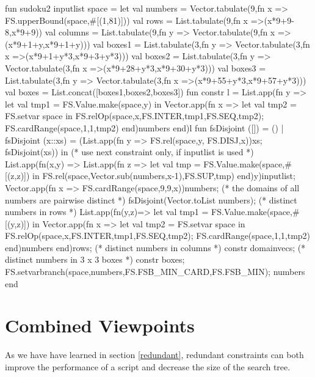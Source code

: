 \documentclass[a4paper,halfparskip]{scrartcl}
\begin{document}
\begin{myverbatim}
fun sudoku2 inputlist space = 
  let
     val numbers = Vector.tabulate(9,fn x => 
                        FS.upperBound(space,#[(1,81)]))
     val rows = List.tabulate(9,fn x =>(x*9+9-8,x*9+9)) 
     val columns = List.tabulate(9,fn y => 
                       Vector.tabulate(9,fn x =>(x*9+1+y,x*9+1+y)))
     val boxes1 = List.tabulate(3,fn y => 
                   Vector.tabulate(3,fn x =>(x*9+1+y*3,x*9+3+y*3)))
     val boxes2 = List.tabulate(3,fn y => 
                   Vector.tabulate(3,fn x =>(x*9+28+y*3,x*9+30+y*3)))
     val boxes3 = List.tabulate(3,fn y => 
                   Vector.tabulate(3,fn x =>(x*9+55+y*3,x*9+57+y*3)))
     val boxes = List.concat([boxes1,boxes2,boxes3])
     fun constr l = 
       List.app(fn y => 
                 let
                    val tmp1 = FS.Value.make(space,y)
                 in
                    Vector.app(fn x => 
                     let 
                        val tmp2 = FS.setvar space 
                     in
                        FS.relOp(space,x,FS.INTER,tmp1,FS.SEQ,tmp2);
                        FS.cardRange(space,1,1,tmp2)
                     end)numbers
                 end)l
     fun fsDisjoint ([]) = ()
       | fsDisjoint (x::xs) = 
            (List.app(fn y => FS.rel(space,y, FS.DISJ,x))xs;
             fsDisjoint(xs))
  in
    (* use next constraint only, if inputlist is used *)
     List.app(fn(x,y) => 
       List.app(fn z => 
                  let 
                     val tmp = FS.Value.make(space,#[(z,z)])
                  in
                     FS.rel(space,Vector.sub(numbers,x-1),FS.SUP,tmp)
                  end)y)inputlist;
     Vector.app(fn x => FS.cardRange(space,9,9,x))numbers;
    (* the domains of all numbers are pairwise distinct *)
     fsDisjoint(Vector.toList numbers);
    (* distinct numbers in rows *)
     List.app(fn(y,z)=>
       let 
          val tmp1 = FS.Value.make(space,#[(y,z)]) 
       in
          Vector.app(fn x => 
                      let 
                         val tmp2 = FS.setvar space 
                      in
                         FS.relOp(space,x,FS.INTER,tmp1,FS.SEQ,tmp2);
                         FS.cardRange(space,1,1,tmp2)
                      end)numbers
       end)rows;
    (* distinct numbers in columns *)
     constr domainvecs;  
    (* distinct numbers in 3 x 3 boxes *)
     constr boxes;   
     FS.setvarbranch(space,numbers,FS.FSB_MIN_CARD,FS.FSB_MIN); 
     numbers
  end
\end{myverbatim}




\newpage
\section{Combined Viewpoints}
As we have have learned in section \ref{redundant}, redundant
constraints can both improve the performance of a script and
decrease the size of the search tree.
\end{document}
